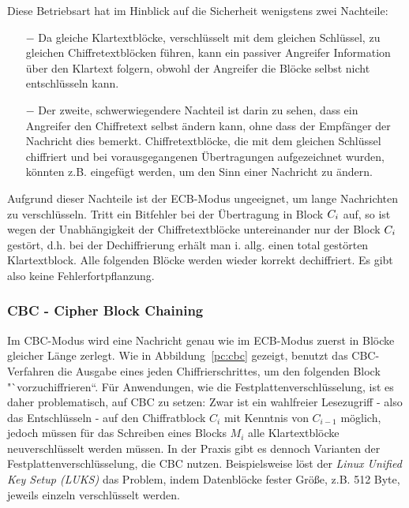 Diese Betriebsart hat im Hinblick auf die Sicherheit wenigstens zwei Nachteile:

\begin{itemize}
  \item[$-$] Da gleiche Klartextblöcke, verschlüsselt mit dem gleichen Schlüssel, zu gleichen Chiffretextblöcken führen, kann ein passiver Angreifer
  Information über den Klartext folgern, obwohl der Angreifer die Blöcke selbst nicht entschlüsseln kann.
  \item[$-$] Der zweite, schwerwiegendere Nachteil ist darin zu sehen, dass ein Angreifer den Chiffretext selbst ändern kann, ohne dass der Empfänger der
  Nachricht dies bemerkt. Chiffretextblöcke, die mit dem gleichen Schlüssel chiffriert und bei vorausgegangenen Übertragungen aufgezeichnet wurden, könnten
  z.B. eingefügt werden, um den Sinn einer Nachricht zu ändern.
\end{itemize}

Aufgrund dieser Nachteile ist der ECB-Modus ungeeignet, um lange Nachrichten zu verschlüsseln. Tritt ein Bitfehler bei der Übertragung in Block $C_i$ auf, so ist wegen der Unabhängigkeit der Chiffretextblöcke untereinander nur der Block
$C_i$ gestört, d.h. bei der Dechiffrierung erhält man i. allg. einen total gestörten Klartextblock. Alle folgenden Blöcke werden wieder korrekt
dechiffriert. Es gibt also keine Fehlerfortpflanzung.

\subsubsection{CBC - Cipher Block Chaining}
\label{cbc}

Im CBC-Modus wird eine Nachricht genau wie im ECB-Modus zuerst in Blöcke gleicher Länge zerlegt. Wie in Abbildung~\ref{pc:cbc} gezeigt, benutzt das CBC-Verfahren die Ausgabe eines jeden Chiffrierschrittes, um den folgenden Block "`vorzuchiffrieren``.
Für Anwendungen, wie die Festplattenverschlüsselung, ist es daher problematisch, auf CBC zu setzen: Zwar ist ein wahlfreier Lesezugriff - also das Entschlüsseln - auf den Chiffratblock $C_i$ mit Kenntnis von $C_{i-1}$ möglich, jedoch müssen für das Schreiben eines Blocks $M_i$ alle Klartextblöcke neuverschlüsselt werden müssen. In der Praxis gibt es dennoch Varianten der Festplattenverschlüsselung, die CBC nutzen.
Beispielsweise löst der \textit{Linux Unified Key Setup (LUKS)} das Problem, indem Datenblöcke fester Größe, z.B. 512 Byte, jeweils einzeln verschlüsselt werden.

